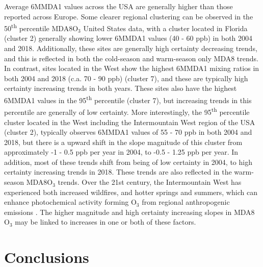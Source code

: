 \documentclass[journal abbreviation, manuscript]{copernicus}
\begin{document}
Average 6MMDA1 values across the USA are generally higher than those reported across Europe. Some clearer regional clustering can be observed in the 50\textsuperscript{th} percentile MDA8O$_3$ United States data, with a cluster located in Florida (cluster 2) generally showing lower 6MMDA1 values (40 - 60 ppb) in both 2004 and 2018. Additionally, these sites are generally high certainty decreasing trends, and this is reflected in both the cold-season and warm-season only MDA8 trends. In contrast, sites located in the West show the highest 6MMDA1 mixing ratios in both 2004 and 2018 (c.a. 70 - 90 ppb) (cluster 7), and these are typically high certainty increasing trends in both years. These sites also have the highest 6MMDA1 values in the 95\textsuperscript{th} percentile (cluster 7), but increasing trends in this percentile are generally of low certainty. More interestingly, the 95\textsuperscript{th} percentile cluster located in the West including the Intermountain West region of the USA (cluster 2), typically observes 6MMDA1 values of 55 - 70 ppb in both 2004 and 2018, but there is a upward shift in the slope magnitude of this cluster from approximately -1 - 0.5 ppb per year in 2004, to -0.5 - 1.25 ppb per year. In addition, most of these trends shift from being of low certainty in 2004, to high certainty increasing trends in 2018. These trends are also reflected in the warm-season MDA8O$_3$ trends. Over the 21st century, the Intermountain West has experienced both increased wildfires, and hotter springs and summers, which can enhance photochemical activity forming O$_3$ from regional anthropogenic emissions \citep{Lin2017, Li2021, Peterson2021, Iglesias2022}. The higher magnitude and high certainty increasing slopes in MDA8 O$_3$ may be linked to increases in one or both of these factors.


\section{Conclusions}  %
\end{document}
